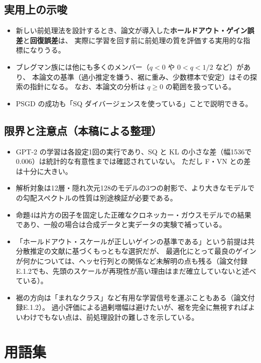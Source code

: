 \documentclass[a4paper,11pt]{ltjsarticle}
\theoremstyle{definition}
\theoremstyle{plain}
\begin{document}
\subsection{実用上の示唆}

\begin{itemize}
  \item 新しい前処理法を設計するとき、論文が導入した\textbf{ホールドアウト・ゲイン誤差}と\textbf{回復誤差}は、
        実際に学習を回す前に前処理の質を評価する実用的な指標になりうる。
  \item ブレグマン族には他にも多くのメンバー（$q<0$ や $0<q<1/2$ など）があり、
        本論文の基準（過小推定を嫌う、裾に重み、少数標本で安定）はその探索の指針になる。
        なお、本論文の分析は $q\ge0$ の範囲を扱っている。
  \item PSGD の成功も「SQ ダイバージェンスを使っている」ことで説明できる。
\end{itemize}

\subsection{限界と注意点（本稿による整理）}

\begin{itemize}
  \item GPT-2 の学習は各設定1回の実行であり、SQ と KL の小さな差（幅1536で0.006）は統計的な有意性までは確認されていない。
        ただし F・VN との差は十分に大きい。
  \item 解析対象は12層・隠れ次元128のモデルの3つの射影で、より大きなモデルでの勾配スペクトルの性質は別途検証が必要である。
  \item 命題4は片方の因子を固定した正確なクロネッカー・ガウスモデルでの結果であり、一般の場合は合成データと実データの実験で補っている。
  \item 「ホールドアウト・スケールが正しいゲインの基準である」という前提は共分散推定の文献に基づくもっともな選択だが、
        最適化にとって最良のゲインが何かについては、ヘッセ行列との関係など未解明の点も残る（論文付録E.1.2でも、先頭のスケールが再現性が高い理由はまだ確立していないと述べている）。
  \item 裾の方向は「まれなクラス」など有用な学習信号を運ぶこともある（論文付録E.1.2）。
        過小評価による過剰増幅は避けたいが、裾を完全に無視すればよいわけでもない点は、前処理設計の難しさを示している。
\end{itemize}

\appendix
\section{用語集}
\end{document}
